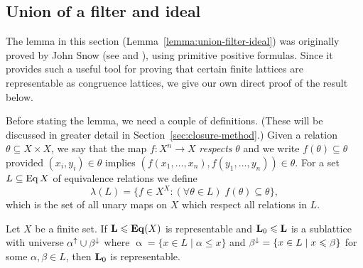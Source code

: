 
\subsection{Union of a filter and ideal}
\label{sec:union-filter-ideal}
The lemma in this section (Lemma~\ref{lemma:union-filter-ideal})
was originally proved by John Snow (see \cite{MR1774743} and \cite{MR2026829}),
using primitive positive
formulas.  Since it provides such a useful tool for proving that certain finite lattices 
are representable as congruence lattices, we give our own direct
proof of the result below. 

Before stating the lemma, we need a couple of definitions.  (These will be
discussed in greater detail in Section~\ref{sec:closure-method}.)
Given a relation $\theta \subseteq X\times X$, we say that the map 
$f: X^n\rightarrow X$ \emph{respects} $\theta$ and we write 
$f(\theta) \subseteq \theta$ provided $(x_i, y_i)\in \theta$ implies
$(f(x_1, \dots, x_n), f(y_1, \dots, y_n))\in \theta$.
For a set $L\subseteq \operatorname{Eq} X$ of equivalence relations we define
\[
\lambda(L) = \{f\in X^X: (\forall \theta \in L) \; f(\theta) \subseteq \theta \},
\]
which is the set of all unary maps on $X$ which respect all relations in $L$.
\begin{lemma} 
  \label{lemma:union-filter-ideal}
  Let $X$ be a finite set.
  If $\mathbf{L} \leqslant \mathbf{Eq}(X)$ is representable and $\mathbf{L}_0\leqslant \mathbf{L}$ is a sublattice with universe
  $\alpha^{\uparrow}\cup \beta^{\downarrow}$ where $\upalpha=\{x\in L \mid \alpha \leq x\}$ and 
  $\beta^{\downarrow}=\{x\in L \mid x\leqslant \beta\}$ for some $\alpha, \beta \in L$, then $\mathbf{L}_0$ is representable.
\end{lemma}

